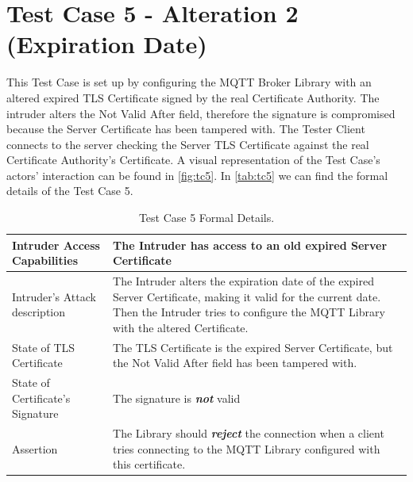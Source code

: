 \documentclass[binding=0.6cm,noexaminfo]{sapthesis}
\begin{document}
\section{Test Case 5 - Alteration 2 (Expiration Date)}
This Test Case is set up by configuring the MQTT Broker Library with an altered expired TLS Certificate signed by the real Certificate Authority. The intruder alters the Not Valid After field, therefore the signature is compromised because the Server Certificate has been tampered with. The Tester Client connects to the server checking the Server TLS Certificate against the real Certificate Authority’s Certificate. A visual representation of the Test Case's actors' interaction can be found in \autoref{fig:tc5}.  In \autoref{tab:tc5} we can find the formal details of the Test Case 5.

\begin{table}
\begin{center}
\begin{tabular}{| p{6cm} | p{6cm} |}
\hline
Intruder Access Capabilities & The Intruder has access to an old expired Server Certificate \\
\hline
Intruder’s Attack description & The Intruder alters the expiration date of the expired Server Certificate, making it valid for the current date. Then the Intruder tries  to configure the MQTT Library with the altered Certificate. \\
\hline
State of TLS Certificate & The TLS Certificate is the expired Server Certificate, but the Not Valid After field has been tampered with. \\
\hline
State of Certificate’s Signature & The signature is \textbf{\textit{not}} valid \\
\hline
Assertion & The Library should \textbf{\textit{reject}} the connection when a client tries connecting to the MQTT Library configured with this certificate. \\
\hline
\end{tabular}
\caption{Test Case 5 Formal Details.}
\label{tab:tc5}
\end{center}
\end{table}
\end{document}
